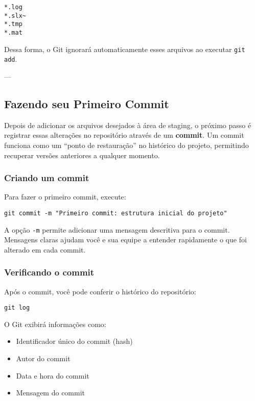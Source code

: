 \begin{lstlisting}[style=shellstyle]
*.log
*.slx~
*.tmp
*.mat
\end{lstlisting}

Dessa forma, o Git ignorará automaticamente esses arquivos ao executar \texttt{git add}.

---

\subsection{Fazendo seu Primeiro Commit}

Depois de adicionar os arquivos desejados à área de staging, o próximo passo é registrar essas alterações no repositório através de um \textbf{commit}. Um commit funciona como um “ponto de restauração” no histórico do projeto, permitindo recuperar versões anteriores a qualquer momento.

\subsubsection*{Criando um commit}

Para fazer o primeiro commit, execute:

\begin{lstlisting}[style=shellstyle]
git commit -m "Primeiro commit: estrutura inicial do projeto"
\end{lstlisting}

\noindent
A opção \texttt{-m} permite adicionar uma mensagem descritiva para o commit. Mensagens claras ajudam você e sua equipe a entender rapidamente o que foi alterado em cada commit.

\subsubsection*{Verificando o commit}

Após o commit, você pode conferir o histórico do repositório:

\begin{lstlisting}[style=shellstyle]
git log
\end{lstlisting}

O Git exibirá informações como:
\begin{itemize}
    \item Identificador único do commit (hash)  
    \item Autor do commit  
    \item Data e hora do commit  
    \item Mensagem do commit
\end{itemize}

